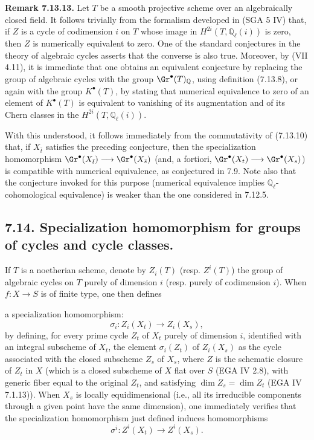 \textbf{Remark 7.13.13.} Let \(T\) be a smooth projective scheme over an algebraically closed field. It follows trivially from the formalism developed in (SGA 5 IV) that, if \(Z\) is a cycle of codimension \(i\) on \(T\) whose image in \(H^{2i}(T,\mathbb Q_\ell(i))\) is zero, then \(Z\) is numerically equivalent to zero. One of the standard conjectures in the theory of algebraic cycles asserts that the converse is also true. Moreover, by (VII 4.11), it is immediate that one obtains an equivalent conjecture by replacing the group of algebraic cycles with the group \(\Gr^\bullet(T)_{\mathbb Q}\), using definition (7.13.8), or again with the group \(K^\bullet(T)\), by stating that numerical equivalence to zero of an element of \(K^\bullet(T)\) is equivalent to vanishing of its augmentation and of its Chern classes in the \(H^{2i}(T,\mathbb Q_\ell(i))\).

With this understood, it follows immediately from the commutativity of (7.13.10) that, if \(X_{\bar t}\) satisfies the preceding conjecture, then the specialization homomorphism \(\Gr^\bullet(X_{\bar t})\longrightarrow \Gr^\bullet(X_{\bar s})\) (and, a fortiori, \(\Gr^\bullet(X_t)\longrightarrow \Gr^\bullet(X_s)\)) is compatible with numerical equivalence, as conjectured in 7.9. Note also that the conjecture invoked for this purpose (numerical equivalence implies \(\mathbb Q_\ell\)-cohomological equivalence) is weaker than the one considered in 7.12.5.

\subsection*{7.14. Specialization homomorphism for groups of cycles and cycle classes.}
If \(T\) is a noetherian scheme, denote by \(Z_i(T)\) (resp. \(Z^i(T)\)) the group of algebraic cycles on \(T\) purely of dimension \(i\) (resp. purely of codimension \(i\)). When \(f:X\to S\) is of finite type, one then defines

%
a specialization homomorphism:
\begin{equation}\tag{7.14.1}
  \sigma_i:Z_i(X_t)\longrightarrow Z_i(X_s),
\end{equation}
by defining, for every prime cycle \(Z_t\) of \(X_t\) purely of dimension \(i\), identified with an integral subscheme of \(X_t\), the element \(\sigma_i(Z_t)\) of \(Z_i(X_s)\) as the cycle associated with the closed subscheme \(Z_s\) of \(X_s\), where \(Z\) is the schematic closure of \(Z_t\) in \(X\) (which is a closed subscheme of \(X\) flat over \(S\) (EGA IV 2.8), with generic fiber equal to the original \(Z_t\), and satisfying \(\dim Z_s=\dim Z_t\) (EGA IV 7.1.13)). When \(X_s\) is locally equidimensional (i.e., all its irreducible components through a given point have the same dimension), one immediately verifies that the specialization homomorphism just defined induces homomorphisms
\begin{equation}\tag{7.14.1 bis}
  \sigma^i:Z^i(X_t)\longrightarrow Z^i(X_s).
\end{equation}

